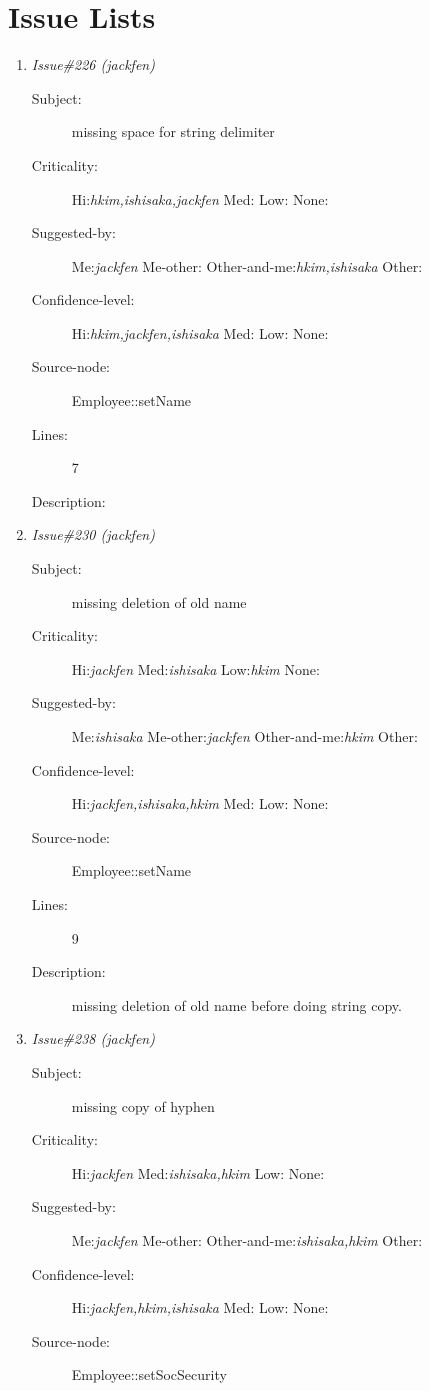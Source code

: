 \section{Issue Lists}
\begin{enumerate}
\item {\it Issue\#226 (jackfen)}
\begin{description}
\item [Subject:] missing space for string delimiter
\item [Criticality:] Hi:{\it hkim,ishisaka,jackfen} Med:{\it } Low:{\it } None:{\it }
\item [Suggested-by:] Me:{\it jackfen} Me-other:{\it } Other-and-me:{\it hkim,ishisaka} Other:{\it }
\item [Confidence-level:] Hi:{\it hkim,jackfen,ishisaka} Med:{\it } Low:{\it } None:{\it }
\item [Source-node:] Employee::setName

\item [Lines:] 7

\item [Description:] 
\end{description}
\item {\it Issue\#230 (jackfen)}
\begin{description}
\item [Subject:] missing deletion of old name
\item [Criticality:] Hi:{\it jackfen} Med:{\it ishisaka} Low:{\it hkim} None:{\it }
\item [Suggested-by:] Me:{\it ishisaka} Me-other:{\it jackfen} Other-and-me:{\it hkim} Other:{\it }
\item [Confidence-level:] Hi:{\it jackfen,ishisaka,hkim} Med:{\it } Low:{\it } None:{\it }
\item [Source-node:] Employee::setName

\item [Lines:] 9

\item [Description:] missing deletion of old name before doing
string copy.
\end{description}
\item {\it Issue\#238 (jackfen)}
\begin{description}
\item [Subject:] missing copy of hyphen
\item [Criticality:] Hi:{\it jackfen} Med:{\it ishisaka,hkim} Low:{\it } None:{\it }
\item [Suggested-by:] Me:{\it jackfen} Me-other:{\it } Other-and-me:{\it ishisaka,hkim} Other:{\it }
\item [Confidence-level:] Hi:{\it jackfen,hkim,ishisaka} Med:{\it } Low:{\it } None:{\it }
\item [Source-node:] Employee::setSocSecurity


\end{description}
\end{enumerate}
